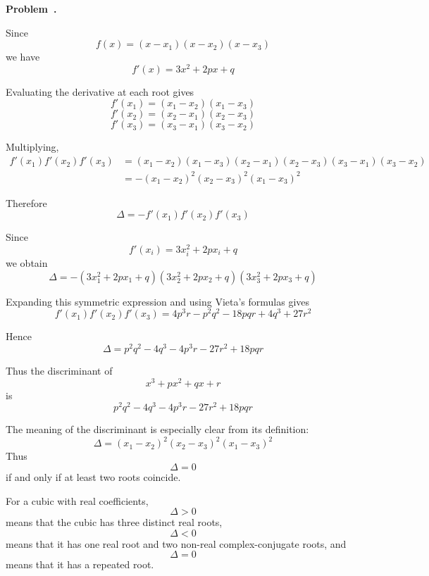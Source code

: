 \documentclass[10pt]{article}
\newcounter{problem}
\newenvironment{problem}[1][]{
  \refstepcounter{problem}
  \par\noindent\textbf{Problem~\theproblem. #1}\par
  \vspace{0.5em}
}{\vspace{1em}}
\begin{document}
\begin{problem}
Since
\[
f(x) = (x - x_1) (x - x_2) (x - x_3)
\]
we have
\[
f'(x) = 3x^2 + 2px + q
\]

Evaluating the derivative at each root gives
\[
f'(x_1) = (x_1 - x_2) (x_1 - x_3)
\]
\[
f'(x_2) = (x_2 - x_1) (x_2 - x_3)
\]
\[
f'(x_3) = (x_3 - x_1) (x_3 - x_2)
\]

Multiplying,
\begin{align*}
f'(x_1)f'(x_2)f'(x_3)
&= (x_1 - x_2) (x_1 - x_3) (x_2 - x_1) (x_2 - x_3) (x_3 - x_1) (x_3 - x_2)\\
&= -(x_1 - x_2)^2 (x_2 - x_3)^2 (x_1 - x_3)^2
\end{align*}

Therefore
\[
\Delta=-f'(x_1)f'(x_2)f'(x_3)
\]

Since
\[
f'(x_i) =3x_i^2 + 2px_i + q
\]
we obtain
\[
\Delta
= -(3x_1^2 + 2px_1 + q) (3x_2^2 + 2px_2 + q) (3x_3^2 + 2px_3 + q)
\]

Expanding this symmetric expression and using Vieta's formulas gives
\[
f'(x_1)f'(x_2)f'(x_3) = 4p^3r - p^2q^2 - 18pqr + 4q^3 + 27r^2
\]

Hence
\[
\Delta = p^2q^2 - 4q^3 - 4p^3r - 27r^2 + 18pqr
\]

Thus the discriminant of
\[
x^3 + px^2 + qx + r
\]
is
\[
p^2q^2 - 4q^3 - 4p^3r - 27r^2 + 18pqr
\]

The meaning of the discriminant is especially clear from its definition:
\[
\Delta = (x_1 - x_2)^2 (x_2 - x_3)^2 (x_1 - x_3)^2
\]
Thus
\[
\Delta=0
\]
if and only if at least two roots coincide.

For a cubic with real coefficients,
\[
\Delta>0
\]
means that the cubic has three distinct real roots,
\[
\Delta<0
\]
means that it has one real root and two non-real complex-conjugate roots, and
\[
\Delta=0
\]
means that it has a repeated root.
\end{problem}
\end{document}
